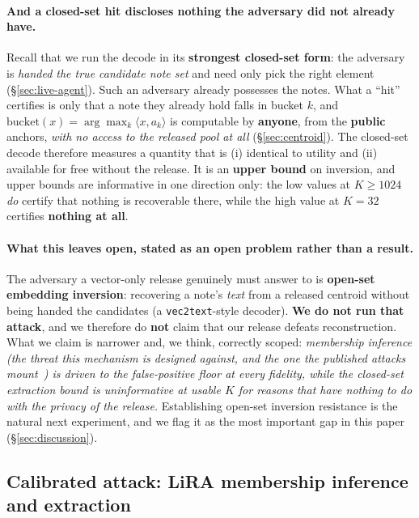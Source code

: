\documentclass[pdflatex,sn-mathphys-num,iicol]{sn-jnl}
\theoremstyle{thmstyleone}%
\theoremstyle{thmstyletwo}%
\theoremstyle{thmstylethree}%
\newcommand{\secref}[1]{\S\ref{#1}}
\begin{document}
\paragraph{And a closed-set hit discloses nothing the adversary did not already have.} Recall
that we run the decode in its \textbf{strongest closed-set form}: the adversary is \emph{handed
the true candidate note set} and need only pick the right element (\secref{sec:live-agent}).
Such an adversary already possesses the notes. What a ``hit'' certifies is only that a note
they already hold falls in bucket $k$, and $\mathrm{bucket}(x) = \arg\max_k \langle x, a_k
\rangle$ is computable by \textbf{anyone}, from the \textbf{public} anchors, \emph{with no
access to the released pool at all} (\secref{sec:centroid}). The closed-set decode therefore
measures a quantity that is (i) identical to utility and (ii) available for free without the
release. It is an \textbf{upper bound} on inversion, and upper bounds are informative in one
direction only: the low values at $K \geq 1024$ \emph{do} certify that nothing is recoverable
there, while the high value at $K = 32$ certifies \textbf{nothing at all}.

\paragraph{What this leaves open, stated as an open problem rather than a result.} The
adversary a vector-only release genuinely must answer to is \textbf{open-set embedding
inversion}: recovering a note's \emph{text} from a released centroid without being handed the
candidates (a \texttt{vec2text}-style decoder). \textbf{We do not run that attack}, and we
therefore do \textbf{not} claim that our release defeats reconstruction. What we claim is
narrower and, we think, correctly scoped: \emph{membership inference (the threat this
mechanism is designed against, and the one the published attacks
mount~\cite{chen2026mrmmia}) is driven to the false-positive floor at every fidelity,
while the closed-set extraction bound is uninformative at usable $K$ for reasons that have
nothing to do with the privacy of the release.} Establishing open-set inversion resistance is
the natural next experiment, and we flag it as the most important gap in this paper
(\secref{sec:discussion}).

\subsection{Calibrated attack: LiRA membership inference and
extraction}\label{sec:lira}
\end{document}
